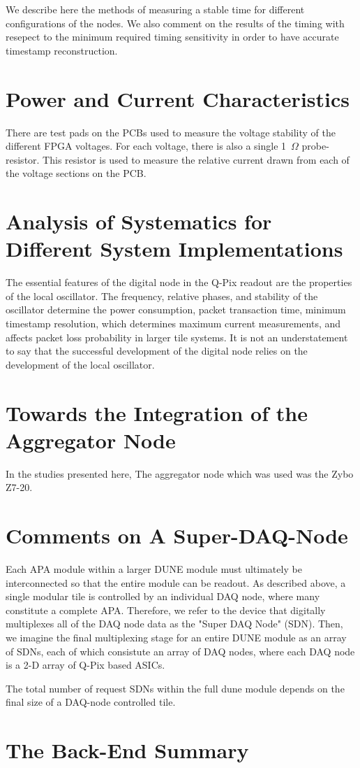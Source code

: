 We describe here the methods of measuring a stable time for different configurations of the nodes.
We also comment on the results of the timing with resepect to the minimum required timing sensitivity in order to have accurate timestamp reconstruction.

\section{Power and Current Characteristics}

There are test pads on the PCBs used to measure the voltage stability of the different FPGA voltages.
For each voltage, there is also a single 1~$\unit{\Omega}$ probe-resistor.
This resistor is used to measure the relative current drawn from each of the voltage sections on the PCB.

\section{Analysis of Systematics for Different System Implementations}

The essential features of the digital node in the Q-Pix readout are the properties of the local oscillator.
The frequency, relative phases, and stability of the oscillator determine the power consumption, packet transaction time, minimum timestamp resolution, which determines maximum current measurements, and affects packet loss probability in larger tile systems.
It is not an understatement to say that the successful development of the digital node relies on the development of the local oscillator.

\section{Towards the Integration of the Aggregator Node}

In the studies presented here, The aggregator node which was used was the Zybo Z7-20.


\section{Comments on A Super-DAQ-Node}

Each APA module within a larger DUNE module must ultimately be interconnected so that the entire module can be readout.
As described above, a single modular tile is controlled by an individual DAQ node, where many constitute a complete APA.
Therefore, we refer to the device that digitally multiplexes all of the DAQ node data as the "Super DAQ Node" (SDN).
Then, we imagine the final multiplexing stage for an entire DUNE module as an array of SDNs, each of which consistute an array of DAQ nodes, where each DAQ node is a 2-D array of Q-Pix based ASICs.

The total number of request SDNs within the full dune module depends on the final size of a DAQ-node controlled tile.


\section{The Back-End Summary}
